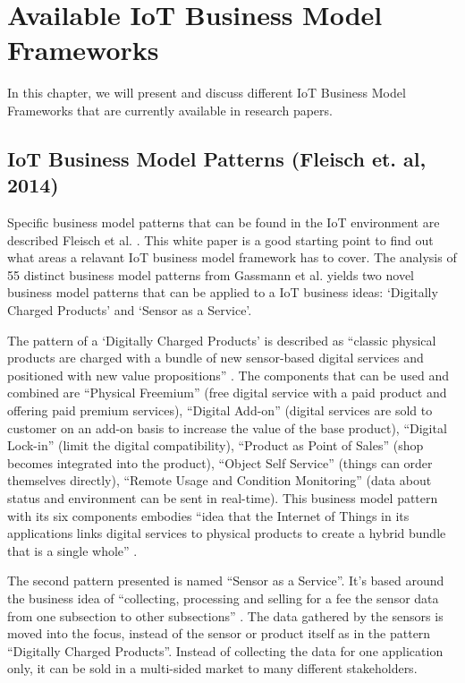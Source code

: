 \section{Available IoT Business Model Frameworks}
\label{sec:bmf_available}
	In this chapter, we will present and discuss different IoT Business Model Frameworks that are currently available in research papers.
	\subsection{IoT Business Model Patterns (Fleisch et. al, 2014)}
		Specific business model patterns that can be found in the IoT environment are described Fleisch et al. \cite{fleisch}. This white paper is a good starting point to find out what areas a relavant IoT business model framework has to cover. The analysis of 55 distinct business model patterns from Gassmann et al. \cite{gassmann55} yields two novel business model patterns that can be applied to a IoT business ideas: `Digitally Charged Products' and `Sensor as a Service'.

		The pattern of a `Digitally Charged Products' is described as ``classic physical products are charged with a bundle
		of new sensor-based digital services and positioned with new value propositions'' \cite[p. 10]{fleisch}. The components that can be used and combined are ``Physical Freemium'' (free digital service with a paid product and offering paid premium services), ``Digital Add-on'' (digital services are sold to customer on an add-on basis to increase the value of the base product), ``Digital Lock-in'' (limit the digital compatibility), ``Product as Point of Sales'' (shop becomes integrated into the product), ``Object Self Service'' (things can order themselves directly), ``Remote Usage and Condition Monitoring'' (data about status and environment can be sent in real-time). This business model pattern with its six components embodies ``idea that the Internet of Things in its applications links digital services to physical products to create a hybrid bundle that is a single whole'' \cite[p. 11]{fleisch}. 

		The second pattern presented is named ``Sensor as a Service''. It's based around the business idea of ``collecting, processing and selling for a fee the sensor data from one subsection to other subsections'' \cite[p. 11]{fleisch}. The data gathered by the sensors is moved into the focus, instead of the sensor or product itself as in the pattern ``Digitally Charged Products''. Instead of collecting the data for one application only, it can be sold in a multi-sided market to many different stakeholders.

